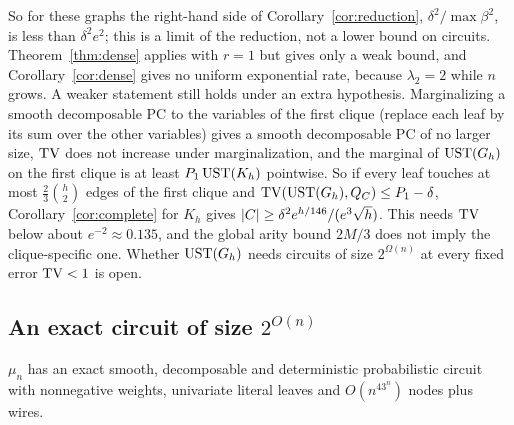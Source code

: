 So for these graphs the right-hand side of Corollary~\ref{cor:reduction}, $\delta^2/\max\beta^2$, is less than $\delta^2e^2$; this is a limit of the reduction, not a lower bound on circuits. Theorem~\ref{thm:dense} applies with $r=1$ but gives only a weak bound, and Corollary~\ref{cor:dense} gives no uniform exponential rate, because $\lambda_2=2$ while $n$ grows. A weaker statement still holds under an extra hypothesis. Marginalizing a smooth decomposable PC to the variables of the first clique (replace each leaf by its sum over the other variables) gives a smooth decomposable PC of no larger size, $\mathrm{TV}$ does not increase under marginalization, and the marginal of $\mathrm{UST}(G_h)$ on the first clique is at least $P_1\,\mathrm{UST}(K_h)$ pointwise. So if every leaf touches at most $\frac23\binom h2$ edges of the first clique and $\mathrm{TV}(\mathrm{UST}(G_h),Q_C)\le P_1-\delta$, Corollary~\ref{cor:complete} for $K_h$ gives $\lvert C\rvert\ge\delta^2e^{h/146}/(e^3\sqrt h)$. This needs $\mathrm{TV}$ below about $e^{-2}\approx0.135$, and the global arity bound $2M/3$ does not imply the clique-specific one. Whether $\mathrm{UST}(G_h)$ needs circuits of size $2^{\Omega(n)}$ at every fixed error $\mathrm{TV}<1$ is open.

\subsection{An exact circuit of size \texorpdfstring{$2^{O(n)}$}{2\textasciicircum O(n)}}

\begin{proposition}\label{prop:complete-upper}
$\mu_n$ has an exact smooth, decomposable and deterministic probabilistic circuit with nonnegative weights, univariate literal leaves and $O(n^43^n)$ nodes plus wires.
\end{proposition}

